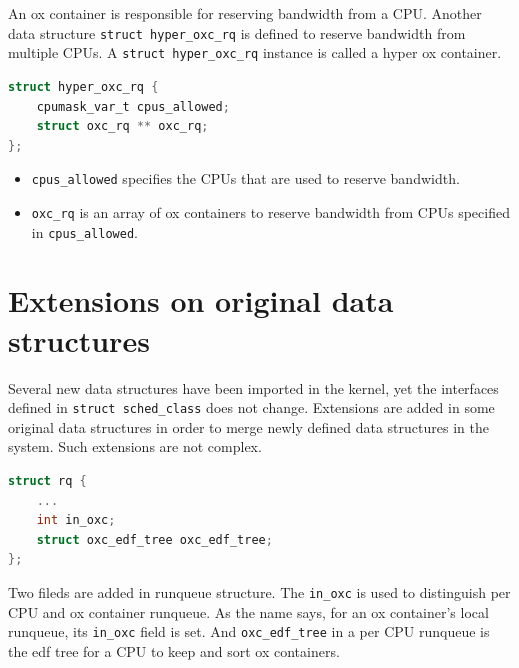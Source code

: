 An ox container is responsible for reserving bandwidth from a CPU.
Another data structure \texttt{struct hyper\_oxc\_rq} is defined to 
reserve bandwidth from multiple CPUs. A \texttt{struct hyper\_oxc\_rq}
instance is called a hyper ox container. 
\begin{lstlisting}[language=C, caption={The hyper ox container}]
struct hyper_oxc_rq {
	cpumask_var_t cpus_allowed;
	struct oxc_rq ** oxc_rq;
};
\end{lstlisting}
\begin{itemize}
\item \texttt{cpus\_allowed} specifies the CPUs that are used to reserve 
				bandwidth.
\item \texttt{oxc\_rq} is an array of ox containers to reserve bandwidth 
		from CPUs specified in \texttt{cpus\_allowed}.
\end{itemize}

\section{Extensions on original data structures}
Several new data structures have been imported in the kernel, yet 
the interfaces defined in \texttt{struct sched\_class} does not change.
Extensions are added in some original data structures in order to merge
newly defined data structures in the system. Such extensions are not complex.
\begin{lstlisting}[language=C, caption={Extensions in \texttt{struct rq}}]
struct rq {
	...
	int in_oxc;
	struct oxc_edf_tree oxc_edf_tree;
};
\end{lstlisting}
Two fileds are added in runqueue structure. The \texttt{in\_oxc} is 
used to distinguish per CPU and ox container runqueue.
As the name says, for an ox container's local runqueue, its 
\texttt{in\_oxc} field is set. And \texttt{oxc\_edf\_tree} in a 
per CPU runqueue is the edf tree for a CPU to keep and sort ox
containers.

